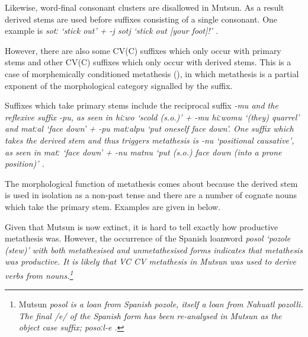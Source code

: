 Likewise, word-final consonant clusters are disallowed in Mutsun.
As a result derived stems are used before suffixes consisting of a single consonant.
One example is \it{sotː} `stick out' + \it{-j} 
{\ra} \it{sotj} `stick out [your foot]!' \citep[125]{ok79}.

However, there are also some CV(C) suffixes which only occur with primary stems
and other CV(C) suffixes which only occur with derived stems.
This is a case of morphemically conditioned metathesis (),
in which metathesis is a partial exponent of the morphological
category signalled by the suffix.

Suffixes which take primary stems include the reciprocal suffix \it{-mu}
and the reflexive suffix \it{-pu},
as seen in \it{hiːwo} `scold (s.o.)' + \it{-mu}  {\ra} \it{hiːwomu} `(they) quarrel' 
and \it{matːal} `face down' + \it{-pu}  {\ra} \it{matːalpu} `put oneself face down'.
One suffix which takes the derived stem and thus triggers metathesis is \it{-nu} `positional causative',
as seen in \it{matː} `face down' + \it{-nu} {\ra} \it{matnu}
`put (s.o.) face down (into a prone position)' \citep[126]{ok79}.

The morphological function of metathesis comes about because the derived stem
is used in isolation as a non-past tense
and there are a number of cognate nouns
which take the primary stem.
Examples are given in  below.

\begin{exe}
	\label{ex:MutDerMet}
\end{exe}

Given that Mutsun is now extinct, it is hard to tell exactly how productive metathesis was.
However, the occurrence of the Spanish loanword \it{posol} `pozole (stew)'
with both metathesised  and unmetathesised forms indicates that metathesis was productive.
It is likely that VC {\ra} CV metathesis in Mutsun was used to derive verbs from nouns.\footnote{
		Mutsun \it{posol} is a loan from Spanish \it{pozole}, itself a loan from Nahuatl \it{pozolli}.
		The final /e/ of the Spanish form has been re-analysed in Mutsun as 
		the object case suffix; \it{posoːl-e} \citep[127, fn.14]{ok77}.}

